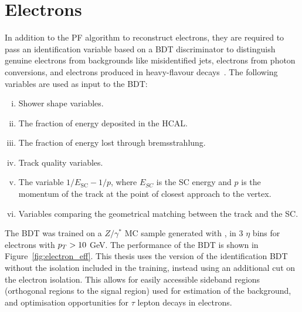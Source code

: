 \section{Electrons}

In addition to the \ac{PF} algorithm to reconstruct electrons, they are required to pass an identification variable based on a \ac{BDT} discriminator to distinguish genuine electrons from backgrounds like misidentified jets, electrons from photon conversions, and electrons produced in heavy-flavour decays~\cite{CMS:2015xaf}.
The following variables are used as input to the \ac{BDT}:

\begin{enumerate}[i)]
\item Shower shape variables.
\item The fraction of energy deposited in the \ac{HCAL}.
\item The fraction of energy lost through bremsstrahlung.
\item Track quality variables.
\item The variable $1/E_{\text{SC}} - 1/p$, where $E_{SC}$ is the \ac{SC} energy and $p$ is the momentum of the track at the point of closest approach to the vertex.
\item Variables comparing the geometrical matching between the track and the \ac{SC}.
\end{enumerate}

The \ac{BDT} was trained on a $Z/\gamma^{*}$ \ac{MC} sample generated with \MADGRAPH, in 3 $\eta$ bins for electrons with $p_{T}>10$ GeV.
The performance of the \ac{BDT} is shown in Figure~\ref{fig:electron_eff}.
This thesis uses the version of the identification \ac{BDT} without the isolation included in the training, instead using an additional cut on the electron isolation. 
This allows for easily accessible sideband regions (orthogonal regions to the signal region) used for estimation of the background, and optimisation opportunities for $\tau$ lepton decays in electrons. \\

